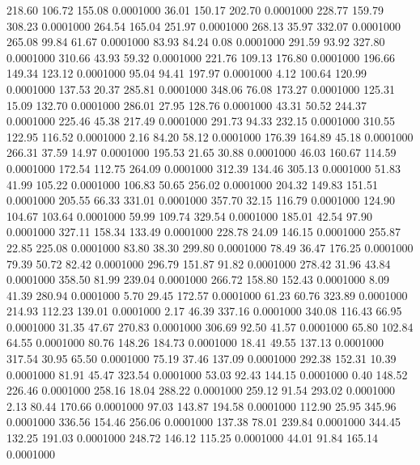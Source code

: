  218.60  106.72  155.08   0.0001000
  36.01  150.17  202.70   0.0001000
 228.77  159.79  308.23   0.0001000
 264.54  165.04  251.97   0.0001000
 268.13   35.97  332.07   0.0001000
 265.08   99.84   61.67   0.0001000
  83.93   84.24    0.08   0.0001000
 291.59   93.92  327.80   0.0001000
 310.66   43.93   59.32   0.0001000
 221.76  109.13  176.80   0.0001000
 196.66  149.34  123.12   0.0001000
  95.04   94.41  197.97   0.0001000
   4.12  100.64  120.99   0.0001000
 137.53   20.37  285.81   0.0001000
 348.06   76.08  173.27   0.0001000
 125.31   15.09  132.70   0.0001000
 286.01   27.95  128.76   0.0001000
  43.31   50.52  244.37   0.0001000
 225.46   45.38  217.49   0.0001000
 291.73   94.33  232.15   0.0001000
 310.55  122.95  116.52   0.0001000
   2.16   84.20   58.12   0.0001000
 176.39  164.89   45.18   0.0001000
 266.31   37.59   14.97   0.0001000
 195.53   21.65   30.88   0.0001000
  46.03  160.67  114.59   0.0001000
 172.54  112.75  264.09   0.0001000
 312.39  134.46  305.13   0.0001000
  51.83   41.99  105.22   0.0001000
 106.83   50.65  256.02   0.0001000
 204.32  149.83  151.51   0.0001000
 205.55   66.33  331.01   0.0001000
 357.70   32.15  116.79   0.0001000
 124.90  104.67  103.64   0.0001000
  59.99  109.74  329.54   0.0001000
 185.01   42.54   97.90   0.0001000
 327.11  158.34  133.49   0.0001000
 228.78   24.09  146.15   0.0001000
 255.87   22.85  225.08   0.0001000
  83.80   38.30  299.80   0.0001000
  78.49   36.47  176.25   0.0001000
  79.39   50.72   82.42   0.0001000
 296.79  151.87   91.82   0.0001000
 278.42   31.96   43.84   0.0001000
 358.50   81.99  239.04   0.0001000
 266.72  158.80  152.43   0.0001000
   8.09   41.39  280.94   0.0001000
   5.70   29.45  172.57   0.0001000
  61.23   60.76  323.89   0.0001000
 214.93  112.23  139.01   0.0001000
   2.17   46.39  337.16   0.0001000
 340.08  116.43   66.95   0.0001000
  31.35   47.67  270.83   0.0001000
 306.69   92.50   41.57   0.0001000
  65.80  102.84   64.55   0.0001000
  80.76  148.26  184.73   0.0001000
  18.41   49.55  137.13   0.0001000
 317.54   30.95   65.50   0.0001000
  75.19   37.46  137.09   0.0001000
 292.38  152.31   10.39   0.0001000
  81.91   45.47  323.54   0.0001000
  53.03   92.43  144.15   0.0001000
   0.40  148.52  226.46   0.0001000
 258.16   18.04  288.22   0.0001000
 259.12   91.54  293.02   0.0001000
   2.13   80.44  170.66   0.0001000
  97.03  143.87  194.58   0.0001000
 112.90   25.95  345.96   0.0001000
 336.56  154.46  256.06   0.0001000
 137.38   78.01  239.84   0.0001000
 344.45  132.25  191.03   0.0001000
 248.72  146.12  115.25   0.0001000
  44.01   91.84  165.14   0.0001000

